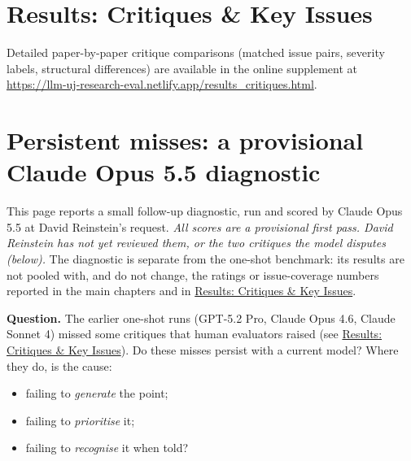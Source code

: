 \documentclass[
  11pt,
  letterpaper,
]{article}
\providecommand{\tightlist}{%
  \setlength{\itemsep}{0pt}\setlength{\parskip}{0pt}}
\begin{document}
\section{Results: Critiques \& Key
Issues}\label{results-critiques-key-issues}

Detailed paper-by-paper critique comparisons (matched issue pairs,
severity labels, structural differences) are available in the online
supplement at
\url{https://llm-uj-research-eval.netlify.app/results_critiques.html}.

\section{Persistent misses: a provisional Claude Opus 5.5
diagnostic}\label{sec-persistent-misses}

\begin{tcolorbox}[enhanced jigsaw, colframe=quarto-callout-warning-color-frame, breakable, rightrule=.15mm, toptitle=1mm, opacitybacktitle=0.6, opacityback=0, colback=white, bottomtitle=1mm, leftrule=.75mm, toprule=.15mm, coltitle=black, bottomrule=.15mm, titlerule=0mm, title=\textcolor{quarto-callout-warning-color}{\faExclamationTriangle}\hspace{0.5em}{Provisional, AI-scored diagnostic · November 4, 2026 (Williams leakage
item corrected November 6)}, colbacktitle=quarto-callout-warning-color!10!white, arc=.35mm, left=2mm]

This page reports a small follow-up diagnostic, run and scored by Claude
Opus 5.5 at David Reinstein's request. \emph{All scores are a
provisional first pass. David Reinstein has not yet reviewed them, or
the two critiques the model disputes (below).} The diagnostic is
separate from the one-shot benchmark: its results are not pooled with,
and do not change, the ratings or issue-coverage numbers reported in the
main chapters and in \hyperref[results-critiques-key-issues]{Results:
Critiques \& Key Issues}.

\end{tcolorbox}

\textbf{Question.} The earlier one-shot runs (GPT-5.2 Pro, Claude Opus
4.6, Claude Sonnet 4) missed some critiques that human evaluators raised
(see \hyperref[results-critiques-key-issues]{Results: Critiques \& Key
Issues}). Do these misses persist with a current model? Where they do,
is the cause:

\begin{itemize}
\tightlist
\item
  failing to \emph{generate} the point;
\item
  failing to \emph{prioritise} it;
\item
  failing to \emph{recognise} it when told?
\end{itemize}
\end{document}
